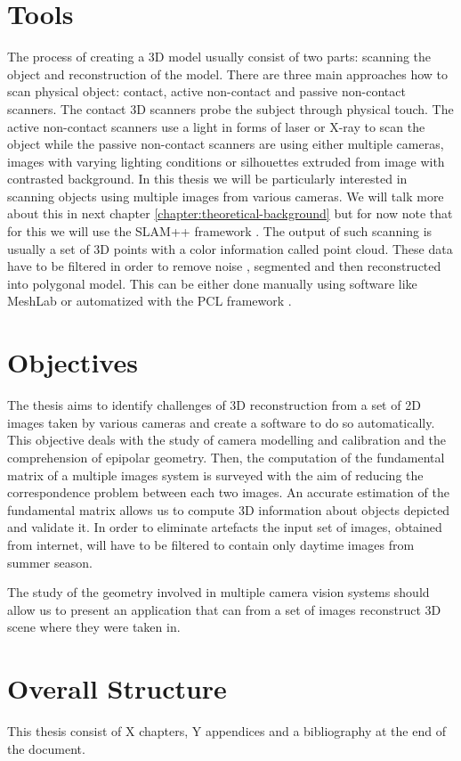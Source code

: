\section{Tools}
The process of creating a 3D model usually consist of two parts: scanning the object and reconstruction of the model. There are three main approaches how to scan physical object: contact, active non-contact  and passive non-contact scanners. The contact 3D scanners probe the subject through physical touch. The active non-contact scanners use a light in forms of laser or X-ray to scan the object while the passive non-contact scanners are using either multiple cameras, images with varying lighting conditions or silhouettes extruded from image with contrasted background. In this thesis we will be particularly interested in scanning objects using multiple images from various cameras. We will talk more about this in next chapter \ref{chapter:theoretical-background} but for now note that for this we will use the SLAM++ framework \cite{www:slam}. The output of such scanning is usually a set of 3D points with a color information called point cloud. These data have to be filtered in order to remove noise , segmented and then reconstructed into polygonal model. This can be either done manually using software like MeshLab \cite{www:meshlab} or automatized with the PCL framework \cite{www:pcl}. 

\section{Objectives}
The thesis aims to identify challenges of 3D reconstruction from a set of 2D images taken by various cameras and create a software to do so automatically. This objective deals with the study of camera modelling and calibration and the comprehension of epipolar geometry. Then, the computation of the fundamental matrix of a multiple images system is surveyed with the aim of reducing the correspondence problem between each two images. An accurate estimation of the fundamental matrix allows us to compute 3D information about objects depicted and validate it. In order to eliminate artefacts the input set of images, obtained from internet, will have to be filtered to contain only daytime images from summer season.

The study of the geometry involved in multiple camera vision systems should allow us to present an application that can from a set of images reconstruct 3D scene where they were taken in.

\section{Overall Structure}
This thesis consist of X chapters, Y appendices and a bibliography at the end of the document.


